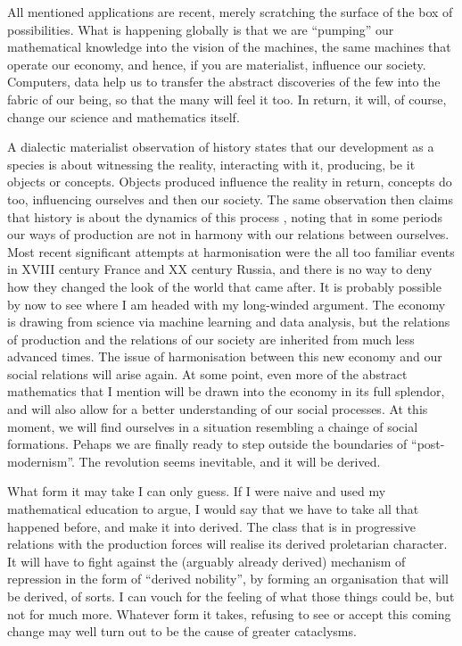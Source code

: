 \documentclass{article}
\begin{document}
All mentioned applications are recent, merely scratching the surface of the box of possibilities. What is happening globally is that we are “pumping” our mathematical knowledge into the vision of the machines, the same machines that operate our economy, and hence, if you are materialist, influence our society. Computers, data help us to transfer the abstract discoveries of the few into the fabric of our being, so that the many will feel it too. In return, it will, of course, change our science and mathematics itself.

A dialectic materialist observation of history states that our development as a species is about witnessing the reality, interacting with it, producing, be it objects or concepts. Objects produced influence the reality in return, concepts do too, influencing ourselves and then our society. The same observation then claims that history is about the dynamics of this process  \cite{MARX,MARXENGCPE}, noting that in some periods our ways of production are not in harmony with our relations between ourselves. Most recent significant attempts at harmonisation were the all too familiar events in XVIII century France and XX century Russia, and there is no way to deny how they changed the look of the world that came after. It is probably possible by now to see where I am headed with my long-winded argument. The economy is drawing from science via machine learning and data analysis,
but the relations of production and the relations of our society are inherited from much less advanced times.
The issue of harmonisation between this new economy and our social relations will arise again. At some point, even more of the abstract mathematics that I mention will be drawn into the economy in its full splendor, and will also allow for a better understanding of our social processes. At this moment, we will find ourselves
in a situation resembling a chainge of social formations. Pehaps we are finally ready to step outside the
boundaries of ``post-modernism''.
The revolution seems inevitable, and it will be derived.

What form it may take I can only guess. If I were naive and used my mathematical education to argue, I would say that we have to take all that happened before, and make it into derived. The class that is in progressive relations with the production forces will realise its derived proletarian character. It will have to fight against the (arguably already derived) mechanism of repression in the form of ``derived nobility'', by forming an organisation that will be derived, of sorts. I can vouch for the feeling of what those things could be, but not for much more. Whatever form it takes, refusing to see or accept this coming change may well turn out to be the cause of greater cataclysms.
\end{document}
